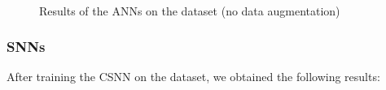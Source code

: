 \documentclass[11pt]{article}
\begin{document}
\begin{figure}[H]
{    \label{fig:conf_mat_resnet}}
  \\
  \hfill
  \hfill
  \label{fig:conf_mat_mobileV2}
  \caption{Results of the ANNs on the dataset (no data augmentation)}
  \label{fig:results_anns}
\end{figure}

\subsubsection*{SNNs}

After training the CSNN on the dataset, we obtained the following results:
\end{document}
